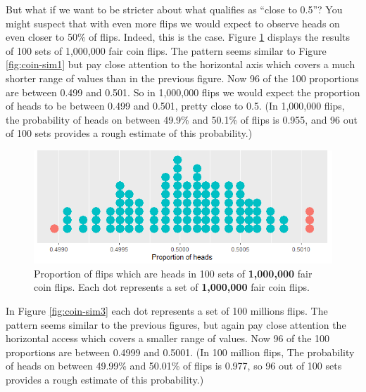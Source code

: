 \documentclass[
]{book}
\theoremstyle{definition}
\theoremstyle{definition}
\theoremstyle{definition}
\theoremstyle{remark}
\begin{document}
But what if we want to be stricter about what qualifies as ``close to 0.5''? You might suspect that with even more flips we would expect to observe heads on even closer to 50\% of flips. Indeed, this is the case. Figure \ref{fig:coin-sim2} displays the results of 100 sets of 1,000,000 fair coin flips. The pattern seems similar to Figure \ref{fig:coin-sim1} but pay close attention to the horizontal axis which covers a much shorter range of values than in the previous figure. Now 96 of the 100 proportions are between 0.499 and 0.501. So in 1,000,000 flips we would expect the proportion of heads to be between 0.499 and 0.501, pretty close to 0.5. (In 1,000,000 flips, the probability of heads on between 49.9\% and 50.1\% of flips is 0.955, and 96 out of 100 sets provides a rough estimate of this probability.)



\begin{figure}
\includegraphics[width=8.65in]{_graphics/coin-sim2} \caption{Proportion of flips which are heads in 100 sets of \textbf{1,000,000} fair coin flips. Each dot represents a set of \textbf{1,000,000} fair coin flips.}\label{fig:coin-sim2}
\end{figure}

In Figure \ref{fig:coin-sim3} each dot represents a set of 100 millions flips. The pattern seems similar to the previous figures, but again pay close attention the horizontal access which covers a smaller range of values. Now 96 of the 100 proportions are between 0.4999 and 0.5001. (In 100 million flips, The probability of heads on between 49.99\% and 50.01\% of flips is 0.977, so 96 out of 100 sets provides a rough estimate of this probability.)
\end{document}
